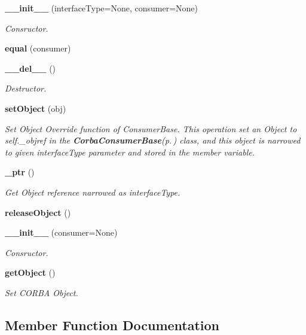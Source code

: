 \begin{CompactItemize}
\item 
{\bf \_\-\_\-init\_\-\_\-} (interface\-Type=None, consumer=None)
\begin{CompactList}\small\item\em Consructor. \item\end{CompactList}\item 
{\bf equal} (consumer)
\item 
{\bf \_\-\_\-del\_\-\_\-} ()
\begin{CompactList}\small\item\em Destructor. \item\end{CompactList}\item 
{\bf set\-Object} (obj)
\begin{CompactList}\small\item\em Set Object Override function of Consumer\-Base. This operation set an Object to self.\_\-objref in the {\bf Corba\-Consumer\-Base}{\rm (p.\,\pageref{classCorbaConsumerBase})} class, and this object is narrowed to given interface\-Type parameter and stored in the member variable. \item\end{CompactList}\item 
{\bf \_\-ptr} ()
\begin{CompactList}\small\item\em Get Object reference narrowed as interface\-Type. \item\end{CompactList}\item 
{\bf release\-Object} ()
\item 
{\bf \_\-\_\-init\_\-\_\-} (consumer=None)
\begin{CompactList}\small\item\em Consructor. \item\end{CompactList}\item 
{\bf get\-Object} ()
\begin{CompactList}\small\item\em Set CORBA Object. \item\end{CompactList}\end{CompactItemize}


\subsection{Member Function Documentation}
